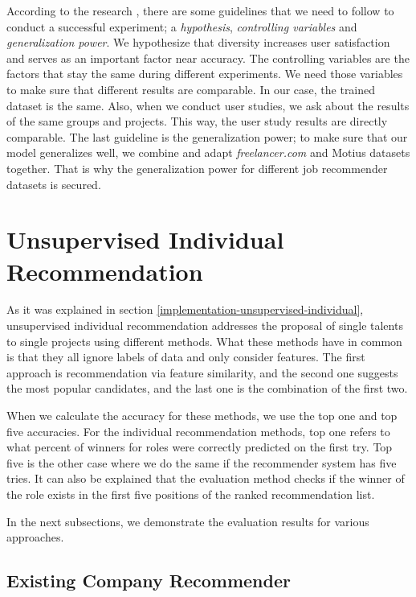 According to the research \cite{shani2011evaluating}, there are some guidelines that we need to follow to conduct a successful experiment; a \textit{hypothesis}, \textit{controlling variables} and \textit{generalization power}. We hypothesize that diversity increases user satisfaction and serves as an important factor near accuracy. The controlling variables are the factors that stay the same during different experiments. We need those variables to make sure that different results are comparable. In our case, the trained dataset is the same. Also, when we conduct user studies, we ask about the results of the same groups and projects. This way, the user study results are directly comparable. The last guideline is the generalization power; to make sure that our model generalizes well, we combine and adapt \textit{freelancer.com} and Motius datasets together. That is why the generalization power for different job recommender datasets is secured. 


\section{Unsupervised Individual Recommendation}\label{unsupervised-individual-recommender}

As it was explained in section \ref{implementation-unsupervised-individual}, unsupervised individual recommendation addresses the proposal of single talents to single projects using different methods. What these methods have in common is that they all ignore labels of data and only consider features. The first approach is recommendation via feature similarity, and the second one suggests the most popular candidates, and the last one is the combination of the first two.

When we calculate the accuracy for these methods, we use the top one and top five accuracies. For the individual recommendation methods, top one refers to what percent of winners for roles were correctly predicted on the first try. Top five is the other case where we do the same if the recommender system has five tries. It can also be explained that the evaluation method checks if the winner of the role exists in the first five positions of the ranked recommendation list.

In the next subsections, we demonstrate the evaluation results for various approaches.


\subsection{Existing Company Recommender}\label{evaluation:existing}

